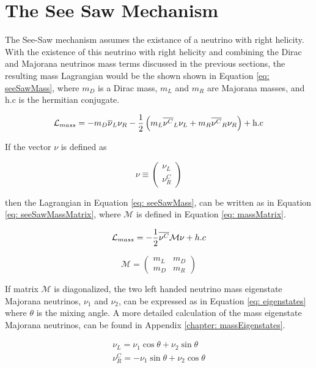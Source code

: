 \section{The See Saw Mechanism}
 

The See-Saw mechanism assumes the existance of a neutrino with right helicity. With the existence of this neutrino with right helicity and combining the Dirac and Majorana neutrinos mass terms discussed in the previous sections, the resulting mass Lagrangian would be the shown shown in Equation \ref{eq: seeSawMass}, where $m_{D}$ is a Dirac mass, $m_{L}$ and $m_{R}$ are Majorana masses, and h.c is the hermitian conjugate.

\begin{equation}\label{eq: seeSawMass}
\mathcal{L}_{mass} = -m_{D}\overline{\nu}_{L}\nu_{R} - \frac{1}{2}\left(m_{L}\overline{\nu^{C}}_{L}\nu_{L} + m_{R}\overline{\nu^{C}}_{R}\nu_{R}\right) + \text{h.c}
\end{equation}

If the vector $\nu$ is defined as

$$ \nu \equiv \begin{pmatrix} \nu_{L}\\ \nu^{C}_{R} \end{pmatrix}$$

then the Lagrangian in Equation \ref{eq: seeSawMass}, can be written as in Equation \ref{eq: seeSawMassMatrix}, where $\mathcal{M}$ is defined in Equation \ref{eq: massMatrix}.

\begin{equation}\label{eq: seeSawMassMatrix}
\mathcal{L}_{mass} = -\frac{1}{2}\overline{\nu^{C}}\mathcal{M}\nu + h.c
\end{equation}

\begin{equation}\label{eq: massMatrix}
\mathcal{M} = \begin{pmatrix} m_{L}&m_{D}\\m_{D}&m_{R} \end{pmatrix}
\end{equation}

If matrix $\mathcal{M}$ is diagonalized, the two left handed neutrino mass eigenstate Majorana neutrinos, $\nu_{1}$ and $\nu_{2}$, can be expressed as in Equation \ref{eq: eigenstates} where $\theta$ is the mixing angle. A more detailed calculation of the mass eigenstate Majorana neutrinos, can be found in Appendix \ref{chapter: massEigenstates}.

\begin{equation*}
\begin{split}
\nu_{L} = \nu_{1} \cos \theta + \nu_{2} \sin \theta \\
\nu_{R}^{C} = -\nu_{1} \sin \theta + \nu_{2} \cos \theta
\end{split}
\end{equation*}


